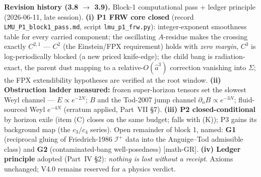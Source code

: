 \documentclass[11pt]{article}
\begin{document}
{\medskip
\noindent\textbf{Revision history (3.8 $\to$ 3.9).} Block-1 computational pass $+$ ledger principle (2026-06-11, late session). \textbf{(i) P1 FRW core closed} (record \texttt{LMU\_P1\_block1\_pass.md}, script \texttt{lmu\_p1\_frw.py}): integer-exponent smoothness table for every carried component; the oscillating $A$-residue makes the crossing exactly $C^{2,1}$ --- $C^2$ (the Einstein/FPX requirement) holds with \emph{zero margin}, $C^3$ is log-periodically blocked (a new priced knife-edge); the child bang is radiation-exact, the parent dust mapping to a relative-$O(\hat a^3)$ correction vanishing into $\Sigma$; the FPX extendibility hypotheses are verified at the root window. \textbf{(ii) Obstruction ladder measured:} frozen super-horizon tensors set the slowest Weyl channel --- $E\propto e^{-2N}$; $B$ and the Tod-2007 jump channel $\partial_n B\propto e^{-3N}$; fluid-sourced Weyl $e^{-4N}$ (erratum applied, Part~VII \S7). \textbf{(iii) P2 closed-conditional} by horizon exile (item (C) closes on the same budget; falls with (K)); P3 gains its background map (the $c_3/c_4$ series). Open remainder of block 1, named: \textbf{G1} (reciprocal gluing of Friedrich-1986 $\mathscr I^+$ data into the Anguige--Tod admissible class) and \textbf{G2} (contaminated-bang well-posedness) [math-GR]. \textbf{(iv) Ledger principle} adopted (Part~IV \S2): \emph{nothing is lost without a receipt}. Axioms unchanged; V4.0 remains reserved for a physics verdict.
\medskip
}
\end{document}
